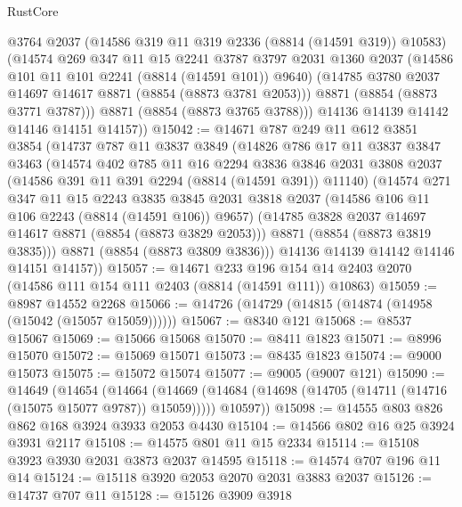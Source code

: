 \begin{lexlean}{RustCore}
\begin{coremodule}
          @3764
          @2037
          (@14586 @319 @11 @319 @2336 (@8814 (@14591 @319)) @10583)
          (@14574
            @269
            @347
            @11
            @15
            @2241
            @3787
            @3797
            @2031
            @1360
            @2037
            (@14586 @101 @11 @101 @2241 (@8814 (@14591 @101)) @9640)
            (@14785 @3780 @2037 @14697 @14617 @8871 (@8854 (@8873 @3781 @2053)))
            @8871
            (@8854 (@8873 @3771 @3787)))
          @8871
          (@8854 (@8873 @3765 @3788)))
        @14136
        @14139
        @14142
        @14146
        @14151
        @14157))
@15042 := @14671
    @787
    @249
    @11
    @612
    @3851
    @3854
    (@14737
      @787
      @11
      @3837
      @3849
      (@14826
        @786
        @17
        @11
        @3837
        @3847
        @3463
        (@14574
          @402
          @785
          @11
          @16
          @2294
          @3836
          @3846
          @2031
          @3808
          @2037
          (@14586 @391 @11 @391 @2294 (@8814 (@14591 @391)) @11140)
          (@14574
            @271
            @347
            @11
            @15
            @2243
            @3835
            @3845
            @2031
            @3818
            @2037
            (@14586 @106 @11 @106 @2243 (@8814 (@14591 @106)) @9657)
            (@14785 @3828 @2037 @14697 @14617 @8871 (@8854 (@8873 @3829 @2053)))
            @8871
            (@8854 (@8873 @3819 @3835)))
          @8871
          (@8854 (@8873 @3809 @3836)))
        @14136
        @14139
        @14142
        @14146
        @14151
        @14157))
@15057 := @14671
    @233
    @196
    @154
    @14
    @2403
    @2070
    (@14586 @111 @154 @111 @2403 (@8814 (@14591 @111)) @10863)
@15059 := @8987 @14552 @2268
@15066 := @14726 (@14729 (@14815 (@14874 (@14958 (@15042 (@15057 @15059))))))
@15067 := @8340 @121
@15068 := @8537 @15067
@15069 := @15066 @15068
@15070 := @8411 @1823
@15071 := @8996 @15070
@15072 := @15069 @15071
@15073 := @8435 @1823
@15074 := @9000 @15073
@15075 := @15072 @15074
@15077 := @9005 (@9007 @121)
@15090 := @14649
    (@14654
      (@14664
        (@14669 (@14684 (@14698 (@14705 (@14711 (@14716 (@15075 @15077 @9787)) @15059)))))
        @10597))
@15098 := @14555 @803 @826 @862 @168 @3924 @3933 @2053 @4430
@15104 := @14566 @802 @16 @25 @3924 @3931 @2117
@15108 := @14575 @801 @11 @15 @2334
@15114 := @15108 @3923 @3930 @2031 @3873 @2037 @14595
@15118 := @14574 @707 @196 @11 @14
@15124 := @15118 @3920 @2053 @2070 @2031 @3883 @2037
@15126 := @14737 @707 @11
@15128 := @15126 @3909 @3918

\end{coremodule}
\end{lexlean}
